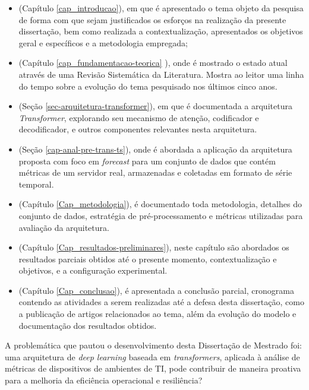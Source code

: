 \begin{itemize}
    \item (Capítulo \ref{cap_introducao}), em que é apresentado o tema objeto da pesquisa de forma com que sejam justificados os esforços na realização da presente dissertação, bem como realizada a contextualização, apresentados os objetivos geral e específicos e a metodologia empregada;
    \item (Capítulo \ref{cap_fundamentacao-teorica} ), onde é mostrado o estado atual através de uma Revisão Sistemática da Literatura. Mostra ao leitor uma linha do tempo sobre a evolução do tema pesquisado nos últimos cinco anos.
    \item (Seção \ref{sec-arquitetura-transformer}), em que é documentada a arquitetura \textit{Transformer}, explorando seu mecanismo de atenção, codificador e decodificador, e outros componentes relevantes nesta arquitetura.
    \item (Seção \ref{cap-anal-pre-trans-ts}), onde é abordada a aplicação da arquitetura proposta com foco em \textit{forecast} para um conjunto de dados que contém métricas de um servidor real, armazenadas e coletadas em formato de série temporal.
    \item (Capítulo \ref{Cap_metodologia}), é documentado toda metodologia, detalhes do conjunto de dados, estratégia de pré-processamento e métricas utilizadas para avaliação da arquitetura.
    \item  (Capítulo \ref{Cap_resultados-preliminares}), neste capítulo são abordados os resultados parciais obtidos até o presente momento, contextualização e objetivos, e a configuração experimental.
    \item (Capítulo \ref{Cap_conclusao}), é apresentada a conclusão parcial, cronograma contendo as atividades a serem realizadas até a defesa desta dissertação, como a publicação de artigos relacionados ao tema, além da evolução do modelo e documentação dos resultados obtidos. 
\end{itemize}

A problemática que pautou o desenvolvimento desta Dissertação de Mestrado foi: uma arquitetura de \textit{deep learning} baseada em \textit{transformers}, aplicada à análise de métricas de dispositivos de ambientes de TI, pode contribuir de maneira proativa para a melhoria da eficiência operacional e resiliência?

